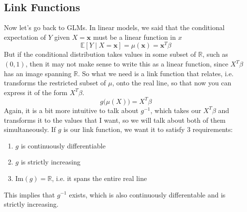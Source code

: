 \documentclass{article}
\begin{document}
  \subsection{Link Functions}

    Now let's go back to GLMs. In linear models, we said that the conditional expectation of $Y$ given $X = \mathbf{x}$ must be a linear function in $x$ 
    \[\mathbb{E}[Y \mid X = \mathbf{x}] = \mu(\mathbf{x}) = \mathbf{x}^T \beta\]
    But if the conditional distribution takes values in some subset of $\mathbb{R}$, such as $(0, 1)$, then it may not make sense to write this as a linear function, since $X^T \beta$ has an image spanning $\mathbb{R}$. So what we need is a link function that relates, i.e. transforms the restricted subset of $\mu$, onto the real line, so that now you can express it of the form $X^T \beta$. 
    \[g \big( \mu(X) \big) = X^T \beta\]
    Again, it is a bit more intuitive to talk about $g^{-1}$, which takes our $X^T \beta$ and transforms it to the values that I want, so we will talk about both of them simultaneously. If $g$ is our link function, we want it to satisfy 3 requirements: 
    \begin{enumerate}
        \item $g$ is continuously differentiable 
        \item $g$ is strictly increasing 
        \item $\mathrm{Im}(g) = \mathbb{R}$, i.e. it spans the entire real line
    \end{enumerate}
    This implies that $g^{-1}$ exists, which is also continuously differentable and is strictly increasing. 
\end{document}
